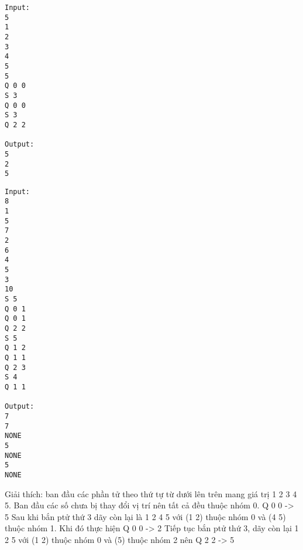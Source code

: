 \begin{verbatim}
Input:
5
1
2
3
4
5
5
Q 0 0
S 3
Q 0 0
S 3
Q 2 2

Output:
5
2
5
\end{verbatim}
\begin{verbatim}
Input:
8
1
5
7
2
6
4
5
3
10
S 5
Q 0 1
Q 0 1
Q 2 2
S 5
Q 1 2
Q 1 1
Q 2 3
S 4
Q 1 1

Output:
7
7
NONE
5
NONE
5
NONE
\end{verbatim}

   Giải thích: ban đầu các phần tử theo thứ tự từ dưới lên trên mang giá trị 1 2 3 4 5. Ban đầu các số chưa bị thay đổi vị trí nên tất cả đều thuộc nhóm 0. Q 0 0 -> 5 Sau khi bắn ptử thứ 3 dãy còn lại là 1 2 4 5 với (1 2) thuộc nhóm 0 và (4 5) thuộc nhóm 1. Khi đó thực hiện Q 0 0 -> 2 Tiếp tục bắn ptử thứ 3, dãy còn lại 1 2 5 với (1 2) thuộc nhóm 0 và (5) thuộc nhóm 2 nên Q 2 2 -> 5